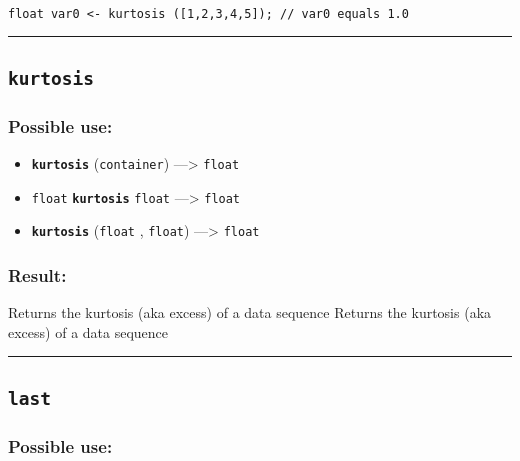 \documentclass[]{book}
\providecommand{\tightlist}{%
  \setlength{\itemsep}{0pt}\setlength{\parskip}{0pt}}
\theoremstyle{definition}
\theoremstyle{definition}
\theoremstyle{definition}
\theoremstyle{remark}
\begin{document}
\begin{verbatim}
 
float var0 <- kurtosis ([1,2,3,4,5]); // var0 equals 1.0
\end{verbatim}

\begin{center}\rule{0.5\linewidth}{\linethickness}\end{center}

\subsection{\texorpdfstring{\texttt{kurtosis}}{kurtosis}}\label{kurtosis-1}

\subsubsection{Possible use:}\label{possible-use-315}

\begin{itemize}
\tightlist
\item
  \textbf{\texttt{kurtosis}} (\texttt{container}) ---\textgreater{}
  \texttt{float}
\item
  \texttt{float} \textbf{\texttt{kurtosis}} \texttt{float}
  ---\textgreater{} \texttt{float}
\item
  \textbf{\texttt{kurtosis}} (\texttt{float} , \texttt{float})
  ---\textgreater{} \texttt{float}
\end{itemize}

\subsubsection{Result:}\label{result-305}

Returns the kurtosis (aka excess) of a data sequence Returns the
kurtosis (aka excess) of a data sequence

\begin{center}\rule{0.5\linewidth}{\linethickness}\end{center}

\subsection{\texorpdfstring{\texttt{last}}{last}}\label{last}

\subsubsection{Possible use:}\label{possible-use-316}
\end{document}
